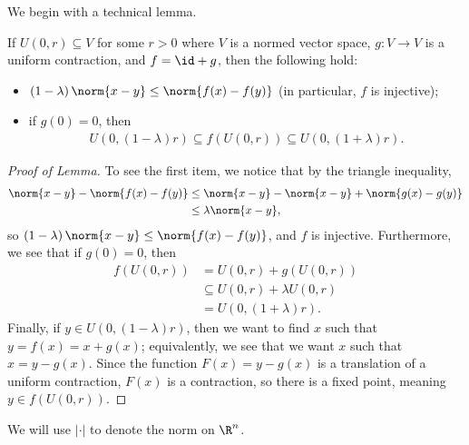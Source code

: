 \documentclass[10pt]{mypackage}
\begin{document}
We begin with a technical lemma.
\begin{lemma}
  If $U\left( 0,r \right)\subseteq V$ for some $r > 0$ where $V$ is a normed vector space, $g\colon V\rightarrow V$ is a uniform contraction, and $f = \id + g$, then the following hold:
  \begin{itemize}
    \item $\left( 1-\lambda \right) \norm{x-y}\leq \norm{f(x)-f(y)}$ (in particular, $f$ is injective);
    \item if $g(0) = 0$, then
      \begin{align*}
        U\left( 0,\left( 1-\lambda \right)r \right) \subseteq f\left( U\left( 0,r \right) \right) \subseteq U\left( 0,\left( 1+\lambda \right)r \right).
      \end{align*}
  \end{itemize}
\end{lemma}
\begin{proof}[Proof of Lemma]
  To see the first item, we notice that by the triangle inequality,
  \begin{align*}
    \norm{x-y} - \norm{f(x)-f(y)} &\leq \norm{x-y} - \norm{x-y} + \norm{g(x)-g(y)}\\
                                  &\leq \lambda\norm{x-y},
  \end{align*}
  so $\left( 1-\lambda \right)\norm{x-y}\leq \norm{f(x)-f(y)}$, and $f$ is injective. Furthermore, we see that if $g(0) = 0$, then
  \begin{align*}
    f\left( U\left( 0,r \right) \right) &= U\left( 0,r \right) + g\left( U\left( 0,r \right) \right)\\
                                        &\subseteq U\left( 0,r \right) + \lambda U\left( 0,r \right)\\
                                        &= U\left( 0,\left( 1+\lambda \right)r \right).
  \end{align*}
  Finally, if $y\in U\left( 0,\left( 1-\lambda \right)r \right)$, then we want to find $x$ such that $y = f(x) = x + g(x)$; equivalently, we see that we want $x$ such that $x = y-g(x)$. Since the function $F(x) = y-g(x)$ is a translation of a uniform contraction, $F(x)$ is a contraction, so there is a fixed point, meaning $y\in f\left( U\left( 0,r \right) \right)$.
\end{proof}
\begin{note}
  We will use $\left\vert \cdot \right\vert$ to denote the norm on $\R^n$.
\end{note}
\end{document}
